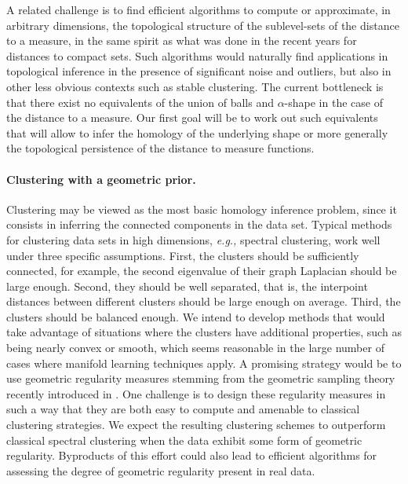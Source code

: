 A related challenge is to find efficient algorithms to compute or approximate,  in arbitrary dimensions, the topological structure of the sublevel-sets of the distance to a measure, in the same spirit as what was done in the recent years for distances to compact sets. Such algorithms would naturally find applications in topological inference in the presence of significant noise and outliers, but also in other less obvious contexts such as stable clustering. The current bottleneck is that there exist no equivalents of the union of balls and $\alpha$-shape in the case of the distance to a measure. Our first goal will be to work out such equivalents that will allow to infer the homology of the underlying shape or more generally the topological persistence of the distance to measure functions.

\paragraph{Clustering with a geometric prior.} 
Clustering may be viewed as the most basic homology inference problem, since it consists in inferring the connected components in the data set. Typical methods for clustering data sets in high dimensions, {\it e.g.,} spectral clustering, work well under three specific assumptions. First, the clusters should be sufficiently connected, for example, the second eigenvalue of their graph Laplacian should be large enough. Second, they should be well separated, that is, the interpoint distances between different clusters should be large enough on average. Third, the clusters should be balanced enough. We intend to develop methods that would take advantage of situations where the clusters have additional properties, such as being nearly convex or smooth, which seems reasonable in the large number of cases where manifold learning techniques apply. A promising strategy would be to use geometric regularity measures stemming from the geometric sampling theory recently introduced in \cite{geometrica-ccl09}. One challenge is to design these regularity measures in such a way that they are both easy to compute and amenable to classical clustering strategies. We expect the resulting clustering schemes to outperform classical spectral clustering when the data exhibit some form of geometric regularity. Byproducts of this effort could also lead to efficient algorithms for assessing the degree of geometric regularity present in real data. 




